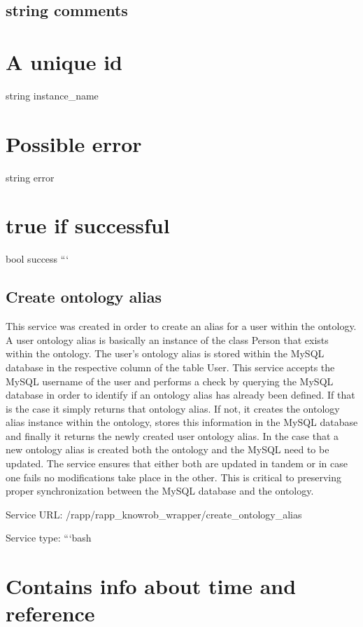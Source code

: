 \subsection*{string comments }

\section*{A unique id}

string instance\-\_\-name \section*{Possible error}

string error \section*{true if successful}

bool success ```

\subsection*{Create ontology alias}

This service was created in order to create an alias for a user within the ontology. A user ontology alias is basically an instance of the class Person that exists within the ontology. The user’s ontology alias is stored within the My\-S\-Q\-L database in the respective column of the table User. This service accepts the My\-S\-Q\-L username of the user and performs a check by querying the My\-S\-Q\-L database in order to identify if an ontology alias has already been defined. If that is the case it simply returns that ontology alias. If not, it creates the ontology alias instance within the ontology, stores this information in the My\-S\-Q\-L database and finally it returns the newly created user ontology alias. In the case that a new ontology alias is created both the ontology and the My\-S\-Q\-L need to be updated. The service ensures that either both are updated in tandem or in case one fails no modifications take place in the other. This is critical to preserving proper synchronization between the My\-S\-Q\-L database and the ontology.

Service U\-R\-L\-: {\ttfamily /rapp/rapp\-\_\-knowrob\-\_\-wrapper/create\-\_\-ontology\-\_\-alias}

Service type\-: ```bash \section*{Contains info about time and reference}

